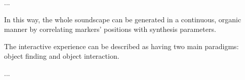 \documentclass{nime-alternate}
\begin{document}


...

In this way, the whole soundscape can be generated in a continuous, organic manner by correlating markers’ positions with synthesis parameters. 

The interactive experience can be described as having two main paradigms: object finding and object interaction. 

...

\end{document}
